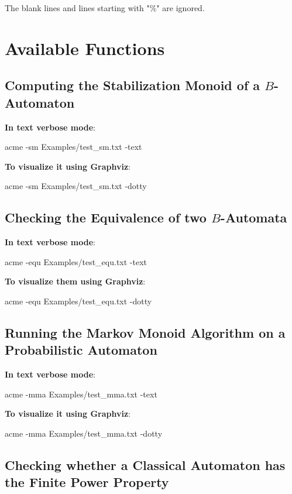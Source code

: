 \documentclass[11pt]{llncs}
\begin{document}
The blank lines and lines starting with "\%" are ignored.

\section{Available Functions}

\subsection{Computing the Stabilization Monoid of a $B$-Automaton}

\noindent\textbf{In text verbose mode}:
\begin{center}acme -sm Examples/test\_sm.txt -text\end{center}

\noindent\textbf{To visualize it using Graphviz}:
\begin{center}acme -sm Examples/test\_sm.txt -dotty\end{center}

\subsection{Checking the Equivalence of two $B$-Automata}

\noindent\textbf{In text verbose mode}:
\begin{center}acme -equ Examples/test\_equ.txt -text\end{center}

\noindent\textbf{To visualize them using Graphviz}:
\begin{center}acme -equ Examples/test\_equ.txt -dotty\end{center}

\subsection{Running the Markov Monoid Algorithm on a Probabilistic Automaton}

\noindent\textbf{In text verbose mode}:
\begin{center}acme -mma Examples/test\_mma.txt -text\end{center}

\noindent\textbf{To visualize it using Graphviz}:
\begin{center}acme -mma Examples/test\_mma.txt -dotty\end{center}

\subsection{Checking whether a Classical Automaton has the Finite Power Property}
\end{document}
